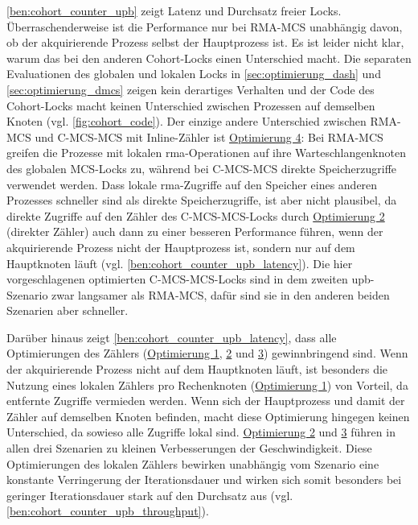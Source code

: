 \autoref{ben:cohort_counter_upb} zeigt Latenz und Durchsatz freier Locks.
Überraschenderweise ist die Performance nur bei RMA-MCS unabhängig davon,
ob der akquirierende Prozess selbst der Hauptprozess ist.
Es ist leider nicht klar,
warum das bei den anderen Cohort-Locks einen Unterschied macht.
Die separaten Evaluationen des globalen und lokalen Locks
in \autoref{sec:optimierung_dash} und \autoref{sec:optimierung_dmcs}
zeigen kein derartiges Verhalten
und der Code des Cohort-Locks macht keinen Unterschied zwischen Prozessen auf demselben Knoten
(vgl. \autoref{fig:cohort_code}).
Der einzige andere Unterschied zwischen RMA-MCS und C-MCS-MCS mit Inline-Zähler ist \hyperref[sec:cohort_opt_4]{Optimierung 4}:
Bei RMA-MCS greifen die Prozesse mit lokalen \gls{rma}-Operationen auf ihre Warteschlangenknoten des globalen MCS-Locks zu,
während bei C-MCS-MCS direkte Speicherzugriffe verwendet werden.
Dass lokale \gls{rma}-Zugriffe auf den Speicher eines anderen Prozesses schneller sind
als direkte Speicherzugriffe,
ist aber nicht plausibel,
da direkte Zugriffe auf den Zähler des C-MCS-MCS-Locks durch
\hyperref[sec:cohort_opt_2]{Optimierung 2} (direkter Zähler)
auch dann zu einer besseren Performance führen,
wenn der akquirierende Prozess nicht der Hauptprozess ist,
sondern nur auf dem Hauptknoten läuft (vgl. \autoref{ben:cohort_counter_upb_latency}).
Die hier vorgeschlagenen optimierten C-MCS-MCS-Locks sind in dem zweiten \gls{upb}-Szenario zwar langsamer
als RMA-MCS,
dafür sind sie in den anderen beiden Szenarien aber schneller.

Darüber hinaus zeigt \autoref{ben:cohort_counter_upb_latency},
dass alle Optimierungen des Zählers
(\hyperref[sec:cohort_opt_1]{Optimierung 1}, \hyperref[sec:cohort_opt_2]{2} und \hyperref[sec:cohort_opt_3]{3})
gewinnbringend sind.
Wenn der akquirierende Prozess nicht auf dem Hauptknoten läuft,
ist besonders die Nutzung eines lokalen Zählers pro Rechenknoten (\hyperref[sec:cohort_opt_1]{Optimierung 1}) von Vorteil,
da entfernte Zugriffe vermieden werden.
Wenn sich der Hauptprozess und damit der Zähler auf demselben Knoten befinden,
macht diese Optimierung hingegen keinen Unterschied,
da sowieso alle Zugriffe lokal sind.
\hyperref[sec:cohort_opt_2]{Optimierung 2} und \hyperref[sec:cohort_opt_3]{3} führen in allen drei Szenarien zu kleinen Verbesserungen der Geschwindigkeit.
Diese Optimierungen des lokalen Zählers bewirken unabhängig vom Szenario eine konstante Verringerung der Iterationsdauer
und wirken sich somit besonders bei geringer Iterationsdauer stark auf den Durchsatz aus (vgl. \autoref{ben:cohort_counter_upb_throughput}).

